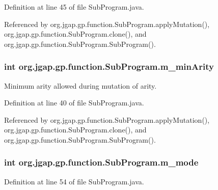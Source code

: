 Definition at line 45 of file Sub\-Program.\-java.



Referenced by org.\-jgap.\-gp.\-function.\-Sub\-Program.\-apply\-Mutation(), org.\-jgap.\-gp.\-function.\-Sub\-Program.\-clone(), and org.\-jgap.\-gp.\-function.\-Sub\-Program.\-Sub\-Program().

\hypertarget{classorg_1_1jgap_1_1gp_1_1function_1_1_sub_program_a414de40b13a4a090fc405e6ccf8a5d34}{
\subsubsection[{m\-\_\-min\-Arity}]{\setlength{\rightskip}{0pt plus 5cm}int org.\-jgap.\-gp.\-function.\-Sub\-Program.\-m\-\_\-min\-Arity\hspace{0.3cm}{\ttfamily [private]}}}\label{classorg_1_1jgap_1_1gp_1_1function_1_1_sub_program_a414de40b13a4a090fc405e6ccf8a5d34}
Minimum arity allowed during mutation of arity. 

Definition at line 40 of file Sub\-Program.\-java.



Referenced by org.\-jgap.\-gp.\-function.\-Sub\-Program.\-apply\-Mutation(), org.\-jgap.\-gp.\-function.\-Sub\-Program.\-clone(), and org.\-jgap.\-gp.\-function.\-Sub\-Program.\-Sub\-Program().

\hypertarget{classorg_1_1jgap_1_1gp_1_1function_1_1_sub_program_ae91718b5521998e6467111bc33de873f}{
\subsubsection[{m\-\_\-mode}]{\setlength{\rightskip}{0pt plus 5cm}int org.\-jgap.\-gp.\-function.\-Sub\-Program.\-m\-\_\-mode\hspace{0.3cm}{\ttfamily [private]}}}\label{classorg_1_1jgap_1_1gp_1_1function_1_1_sub_program_ae91718b5521998e6467111bc33de873f}


Definition at line 54 of file Sub\-Program.\-java.



